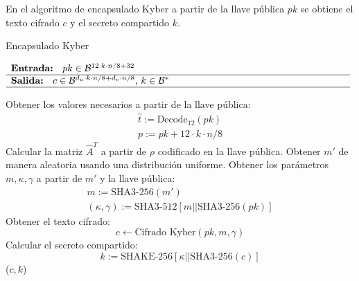  En el algoritmo de encapsulado Kyber a partir de la llave pública \(pk\) se obtiene el texto cifrado \(c\) y el secreto compartido \(k\). 
\begin{algorithm}[H]
	\small 
	\caption{Encapsulado Kyber}
	$\begin{array}{p{\textwidth}}
		\textbf{Entrada: } \(pk\in \mathcal{B}^{12\cdot k\cdot n/8+32}\)\\ 
		\hline
		\textbf{Salida: } \(c\in \mathcal{B}^{d_u\cdot k\cdot n/8+d_v\cdot n/8}\), \(k\in \mathcal{B}^{*}\)\\ 
		\hline
	\end{array}$
	\begin{algorithmic}[1]
		\State Obtener los valores necesarios a partir de la llave pública:
		\begin{equation}
			\begin{array}{l}
			\hat{t}:=\text{Decode}_{12}(pk)\\
			p:=pk+12\cdot k\cdot n/8
			\end{array} 
		\end{equation}
		\State Calcular la matriz \(\hat{A}^T\) a partir de \(\rho\) codificado en la llave pública.
		\State Obtener \(m'\) de manera aleatoria usando una distribución uniforme.
		\State Obtener los parámetros \(m, \kappa, \gamma\) a partir de \(m'\) y la llave pública:
		\begin{equation}
			\begin{array}{l}
				m:=\text{SHA3-256}(m')\\
				(\kappa,\gamma):=\text{SHA3-512}[m||\text{SHA3-256}(pk)]
			\end{array} 
		\end{equation}
		\State Obtener el texto cifrado:
		\begin{equation}
			c \gets \text{Cifrado Kyber}(pk,m,\gamma)
		\end{equation}
		\State Calcular el secreto compartido:
		\begin{equation}
			k:= \text{SHAKE-256}[\kappa||\text{SHA3-256}(c)]
		\end{equation}
		\State \Return (\(c,k\))
	\end{algorithmic}
\end{algorithm}

